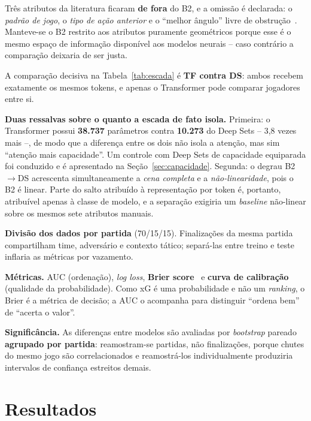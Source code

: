 \documentclass[12pt]{article}
\begin{document}
Três atributos da literatura ficaram \textbf{de fora} do B2, e a omissão é
declarada: o \emph{padrão de jogo}, o \emph{tipo de ação anterior} e o ``melhor
ângulo'' livre de
obstrução~\cite{iapteff2025interpretable,mead2023expected,lucey2015quality}.
Manteve-se o B2 restrito aos atributos puramente geométricos porque esse é o
mesmo espaço de informação disponível aos modelos neurais -- caso contrário a
comparação deixaria de ser justa.

A comparação decisiva na Tabela~\ref{tab:escada} é \textbf{TF contra DS}: ambos
recebem exatamente os mesmos tokens, e apenas o Transformer pode comparar
jogadores entre si.

\textbf{Duas ressalvas sobre o quanto a escada de fato isola.} Primeira: o
Transformer possui \textbf{38.737} parâmetros contra \textbf{10.273} do Deep Sets
-- 3,8 vezes mais --, de modo que a diferença entre os dois não isola a atenção,
mas sim ``atenção mais capacidade''. Um controle com Deep Sets de capacidade
equiparada foi conduzido e é apresentado na Seção~\ref{sec:capacidade}. Segunda: o degrau B2$\rightarrow$DS acrescenta simultaneamente a
\emph{cena completa} e a \emph{não-linearidade}, pois o B2 é linear. Parte do
salto atribuído à representação por token é, portanto, atribuível apenas à classe
de modelo, e a separação exigiria um \emph{baseline} não-linear sobre os mesmos
sete atributos manuais.

\textbf{Divisão dos dados por partida} (70/15/15). Finalizações da mesma partida
compartilham time, adversário e contexto tático; separá-las entre treino e teste
inflaria as métricas por vazamento.

\textbf{Métricas.} AUC (ordenação), \emph{log loss}, \textbf{Brier score}~\cite{brier1950} e
\textbf{curva de calibração}~\cite{niculescu2005} (qualidade da probabilidade). Como xG é uma
probabilidade e não um \emph{ranking}, o Brier é a métrica de decisão; a AUC o
acompanha para distinguir ``ordena bem'' de ``acerta o valor''.

\textbf{Significância.} As diferenças entre modelos são avaliadas por
\emph{bootstrap} pareado \textbf{agrupado por partida}: reamostram-se partidas,
não finalizações, porque chutes do mesmo jogo são correlacionados e reamostrá-los
individualmente produziria intervalos de confiança estreitos demais.

\section{Resultados}
\end{document}
